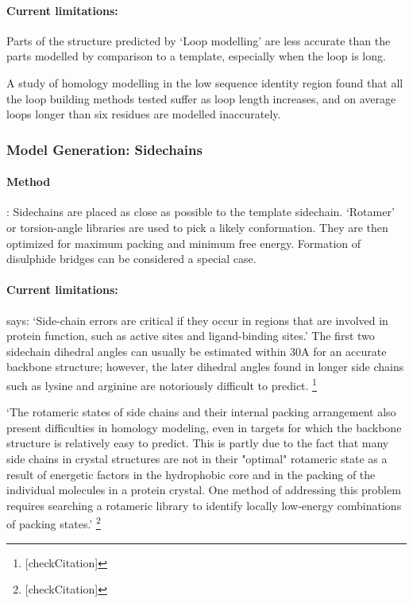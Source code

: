 \documentclass[10pt]{report}
\begin{document}
\paragraph{Current limitations:} Parts of the structure predicted by `Loop modelling' are less accurate than the parts modelled by comparison to a template, especially when the loop is long.

A study of homology modelling in the low sequence identity region found that all the loop building methods tested suffer as loop length increases, and on average loops longer than six residues are modelled inaccurately. \cite{dalton07}

\subsubsection{Model Generation: Sidechains}

\paragraph{Method}: Sidechains are placed as close as possible to the template sidechain. `Rotamer' or torsion-angle libraries are used to pick a likely conformation. They are then optimized for maximum packing and minimum free energy. Formation of disulphide bridges can be considered a special case. \cite{marti-renom2000com}

\paragraph{Current limitations:} \cite{marti-renom2000com} says: `Side-chain errors are critical if they occur in regions that are involved in protein function, such as active sites and ligand-binding sites.' The first two sidechain dihedral angles can usually be estimated within 30A for an accurate backbone structure; however, the later dihedral angles found in longer side chains such as lysine and arginine are notoriously difficult to predict. \cite{wikipedia-homology07} \footnote{[checkCitation]}

`The rotameric states of side chains and their internal packing arrangement also present difficulties in homology modeling, even in targets for which the backbone structure is relatively easy to predict. This is partly due to the fact that many side chains in crystal structures are not in their "optimal" rotameric state as a result of energetic factors in the hydrophobic core and in the packing of the individual molecules in a protein crystal. One method of addressing this problem requires searching a rotameric library to identify locally low-energy combinations of packing states.' \cite{wikipedia-homology07} \footnote{[checkCitation]}
\end{document}
